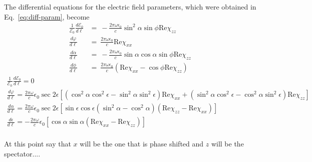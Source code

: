 \documentclass[11pt,letter]{article}
\newcommand{\efieldo}{\ensuremath{\mathcal{E}_{0}}}
\begin{document}
The differential equations for the electric field parameters, which were
obtained in Eq.~\ref{eq:diff-param}, become 
\begin{equation}
\begin{split}
 \frac{1}{\efieldo} \frac{d \efieldo }{ d \ell} & = \   
     -\frac{2\pi \omega\epsilon_{0}}{ c} \sin^{2}\!\alpha \sin\phi \text{Re}\chi_{zz}  \\ 
 \frac{ d \varphi }{d \ell} & = \  
     \frac{2\pi\omega\epsilon_{0}}{ c} \text{Re}\chi_{xx}  \\
 \frac{ d \alpha}{ d \ell} & = \   
     -\frac{2\pi\omega\epsilon_{0}}{c} \sin\alpha \cos\alpha \sin\phi \text{Re}\chi_{zz}  \\
 \frac{ d \phi}{ d \ell} & = \ 
      \frac{2\pi\omega\epsilon_{0}}{c }
     \left(  \text{Re}\chi_{xx} 
       - \cos\phi \text{Re}\chi_{zz}\right)
\end{split}
\end{equation}
\begin{align} 
 \frac{1}{\efieldo} \frac{d \efieldo }{ d \ell} = 0 \\  
 \frac{ d \varphi }{d \ell} = 
     \frac{2\pi\omega}{c} \epsilon_{0} \sec 2 \epsilon[
            ( \cos^{2}\alpha\cos^{2}\epsilon - \sin^{2}\alpha\sin^{2}\epsilon) 
            \text{Re}\chi_{xx}  
         +  ( \sin^{2}\alpha\cos^{2}\epsilon - \cos^{2}\alpha\sin^{2}\epsilon) 
            \text{Re}\chi_{zz}  ]  \\ 
 \frac{ d \alpha}{ d \ell} = 
     \frac{2\pi\omega}{c} \epsilon_{0} \sec 2 \epsilon[
            \sin\epsilon\cos\epsilon
            ( \sin^{2}\alpha - \cos^{2}\alpha)
            ( \text{Re}\chi_{zz} - \text{Re}\chi_{xx} ) ] \\ 
 \frac{ d \epsilon}{ d \ell} = 
     - \frac{2\pi\omega}{c} \epsilon_{0} [
            \cos\alpha \sin\alpha ( \text{Re}\chi_{xx} - \text{Re}\chi_{zz} ) ]\\ 
\end{align}

At this point say that $x$ will be the one that is phase shifted and $z$ will
be the spectator....
\end{document}
